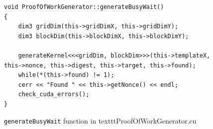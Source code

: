 \documentclass[a4paper]{article}
\begin{document}
\begin{figure}
\begin{lstlisting}
void ProofOfWorkGenerator::generateBusyWait()
{
    dim3 gridDim(this->gridDimX, this->gridDimY);
    dim3 blockDim(this->blockDimX, this->blockDimY);

    generateKernel<<<gridDim, blockDim>>>(this->templateX, this->nonce, this->digest, this->target, this->found);
    while(*(this->found) != 1);
    cerr << "Found " << this->getNonce() << endl;
    check_cuda_errors();
}
\end{lstlisting}
\caption{\label{fig:generateBusyWait} \texttt{generateBusyWait} function in texttt{ProofOfWorkGenerator.cu}}
\end{figure}
\end{document}
